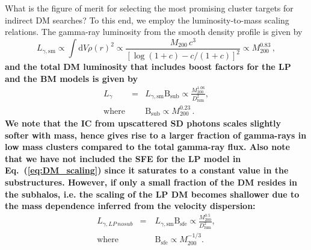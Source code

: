 \documentclass[10pt,aps,pra,reprint,amsmath,amsfonts,amssymb,showpacs,nofootinbib,floatfix]{revtex4-1}
\def\del#1{{}}
\def\C#1{{\bf #1}}
\newcommand{\rmn}{\mathrm}
\newcommand{\sfe}{\rmn{sfe}}
\newcommand{\sub}{\rmn{sub}}
\newcommand{\B}{\rmn{B}}
\newcommand{\sm}{\rmn{sm}}
\newcommand{\dd}{\rmn{d}}
\newcommand{\mvir}{M_{200}}
\begin{document}
What is the figure of merit for selecting the most promising cluster
targets for indirect DM searches? To this end, we employ the
luminosity-to-mass scaling relations. The gamma-ray luminosity from
the smooth density profile is given by \cite{2009PhRvL.103r1302P}
\begin{equation}
L_{\gamma,\sm} \propto \int \dd V \rho(r)^2 \propto \frac{M_{200}\,c^3}
{\left[\log\left(1+c\right)-c/(1+c)\right]^2} \propto \mvir^{0.83}\,,
\end{equation}
\del{and the total DM luminosity that includes boost factors for the LP and
the BM models are given by}
\del{Hence, increasing the cluster mass in the BM model by a factor two
more than doubles the luminosity, but increasing the luminosity
distance, $D_\rmn{lum}$, by a factor two decrease the flux by a factor
four. We note that the IC from upscattered SD photons scales slightly
softer with mass, hence gives rise to a larger fraction of gamma-rays
in low mass clusters compared to the total gamma-ray flux.}
\C{and the total DM luminosity that includes boost factors for the LP and
the BM models is given by
\begin{eqnarray}
\label{eq:DM_scaling}
L_{\gamma} &=& L_{\gamma,\rmn{sm}} \B_\rmn{sub} \propto \frac{\mvir^{1.06}}{D_\rmn{lum}^2},\\
\rmn{where} & &\B_\sub \propto \mvir^{0.23}\,.
\end{eqnarray}
We note that the IC from upscattered SD photons scales slightly softer
with mass, hence gives rise to a larger fraction of gamma-rays in low
mass clusters compared to the total gamma-ray flux. Also note that we
have not included the SFE for the LP model in
Eq.~(\ref{eq:DM_scaling}) since it saturates to a constant value in
the substructures. However, if only a small fraction of the DM resides
in the subhalos, i.e. the scaling of the LP DM becomes shallower due
to the mass dependence inferred from the velocity dispersion:
\begin{eqnarray}
L_{\gamma,LP~nosub} &=& L_{\gamma,\rmn{sm}} \B_\rmn{sfe} 
\propto \frac{\mvir^{0.5}}{D_\rmn{lum}^2},\\
\rmn{where} &\quad&\B_\rmn{sfe} \propto \mvir^{-1/3}.
\end{eqnarray}}
\end{document}
